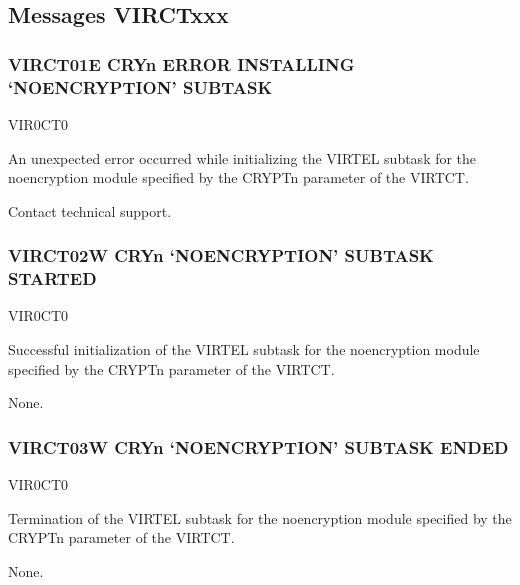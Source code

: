 \documentclass[letterpaper,10pt,english]{sphinxmanual}
\begin{document}
\subsection{Messages VIRCTxxx}
\label{\detokenize{messages:messages-virctxxx}}

\subsubsection{VIRCT01E CRYn ERROR INSTALLING ‘NO\sphinxhyphen{}ENCRYPTION’ SUBTASK}
\label{\detokenize{messages:virct01e-cryn-error-installing-no-encryption-subtask}}\begin{description}
\sphinxAtStartPar
VIR0CT0

\sphinxAtStartPar
An unexpected error occurred while initializing the VIRTEL subtask for the no\sphinxhyphen{}encryption module specified by the CRYPTn parameter of the VIRTCT.

\sphinxAtStartPar
Contact technical support.

\end{description}


\subsubsection{VIRCT02W CRYn ‘NO\sphinxhyphen{}ENCRYPTION’ SUBTASK STARTED}
\label{\detokenize{messages:virct02w-cryn-no-encryption-subtask-started}}\begin{description}
\sphinxAtStartPar
VIR0CT0

\sphinxAtStartPar
Successful initialization of the VIRTEL subtask for the no\sphinxhyphen{}encryption module specified by the CRYPTn parameter of the VIRTCT.

\sphinxAtStartPar
None.

\end{description}


\subsubsection{VIRCT03W CRYn ‘NO\sphinxhyphen{}ENCRYPTION’ SUBTASK ENDED}
\label{\detokenize{messages:virct03w-cryn-no-encryption-subtask-ended}}\begin{description}
\sphinxAtStartPar
VIR0CT0

\sphinxAtStartPar
Termination of the VIRTEL subtask for the no\sphinxhyphen{}encryption module specified by the CRYPTn parameter of the VIRTCT.

\sphinxAtStartPar
None.

\end{description}
\end{document}
